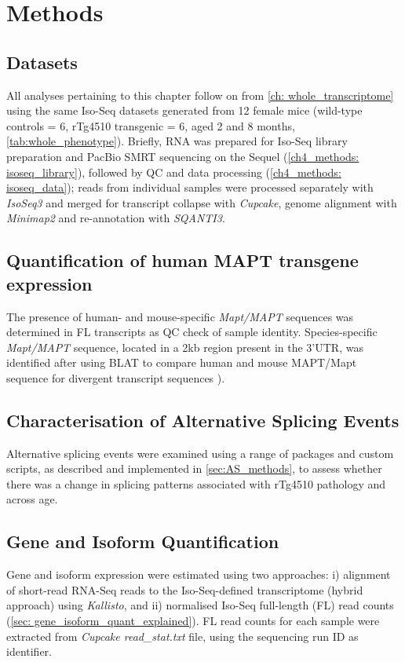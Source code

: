 \section{Methods}

\subsection{Datasets}
All analyses pertaining to this chapter follow on from \cref{ch: whole_transcriptome} using the same Iso-Seq datasets generated from 12 female mice (wild-type controls = 6, rTg4510 transgenic = 6, aged 2 and 8 months, \cref{tab:whole_phenotype}). Briefly, RNA was prepared for Iso-Seq library preparation and PacBio SMRT sequencing on the Sequel (\cref{ch4_methods: isoseq_library}), followed by QC and data processing (\cref{ch4_methods: isoseq_data}); reads from individual samples were processed separately with \textit{IsoSeq3} and merged for transcript collapse with \textit{Cupcake}, genome alignment with \textit{Minimap2} and re-annotation with \textit{SQANTI3}. 

\subsection{Quantification of human MAPT transgene expression} 
The presence of human- and mouse-specific \textit{Mapt/MAPT} sequences was determined in FL transcripts as QC check of sample identity. Species-specific \textit{Mapt/MAPT} sequence, located in a 2kb region present in the 3'UTR, was identified after using BLAT\cite{Kent2002} to compare human and mouse MAPT/Mapt sequence for divergent transcript sequences \cite{Castanho2020}).  

\subsection{Characterisation of Alternative Splicing Events} 
Alternative splicing events were examined using a range of packages and custom scripts, as described and implemented in \cref{sec:AS_methods}, to assess whether there was a change in splicing patterns associated with rTg4510 pathology and across age. 


\subsection{Gene and Isoform Quantification}
Gene and isoform expression were estimated using two approaches: i) alignment of short-read RNA-Seq reads to the Iso-Seq-defined transcriptome (hybrid approach) using \textit{Kallisto}, and ii) normalised Iso-Seq full-length (FL) read counts (\cref{sec: gene_isoform_quant_explained}). FL read counts for each sample were extracted from \textit{Cupcake read\_stat.txt} file, using the sequencing run ID as identifier. 

